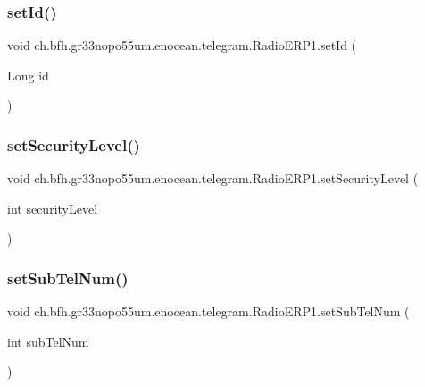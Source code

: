 \subsubsection{\texorpdfstring{set\+Id()}{setId()}}
{\footnotesize\ttfamily void ch.\+bfh.\+gr33nopo55um.\+enocean.\+telegram.\+Radio\+E\+R\+P1.\+set\+Id (\begin{DoxyParamCaption}\item[{Long}]{id }\end{DoxyParamCaption})}

\hypertarget{classch_1_1bfh_1_1gr33nopo55um_1_1enocean_1_1telegram_1_1_radio_e_r_p1_ab1e2f78109a2aaf4c0df4b75ffd83fee}{}\label{classch_1_1bfh_1_1gr33nopo55um_1_1enocean_1_1telegram_1_1_radio_e_r_p1_ab1e2f78109a2aaf4c0df4b75ffd83fee} 
\subsubsection{\texorpdfstring{set\+Security\+Level()}{setSecurityLevel()}}
{\footnotesize\ttfamily void ch.\+bfh.\+gr33nopo55um.\+enocean.\+telegram.\+Radio\+E\+R\+P1.\+set\+Security\+Level (\begin{DoxyParamCaption}\item[{int}]{security\+Level }\end{DoxyParamCaption})}

\hypertarget{classch_1_1bfh_1_1gr33nopo55um_1_1enocean_1_1telegram_1_1_radio_e_r_p1_ada5a90f519ee57c5b7eb34d864cace46}{}\label{classch_1_1bfh_1_1gr33nopo55um_1_1enocean_1_1telegram_1_1_radio_e_r_p1_ada5a90f519ee57c5b7eb34d864cace46} 
\subsubsection{\texorpdfstring{set\+Sub\+Tel\+Num()}{setSubTelNum()}}
{\footnotesize\ttfamily void ch.\+bfh.\+gr33nopo55um.\+enocean.\+telegram.\+Radio\+E\+R\+P1.\+set\+Sub\+Tel\+Num (\begin{DoxyParamCaption}\item[{int}]{sub\+Tel\+Num }\end{DoxyParamCaption})}

